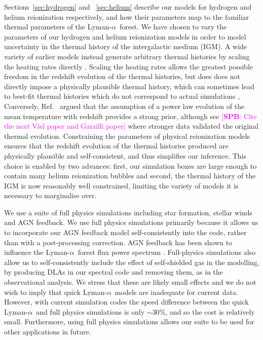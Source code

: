 \documentclass[a4paper,11pt]{article}
\newcommand{\spb}[1]{{\textcolor{magenta}{[{\bf SPB}: #1]}}}
\newcommand{\Lya}{Lyman-$\alpha$}
\begin{document}
Sections~\ref{sec:hydrogen} and ~\ref{sec:helium} describe our models for hydrogen and helium reionization respectively, and how their parameters map to the familiar thermal parameters of the \Lya~forest. We have chosen to vary the parameters of our hydrogen and helium reionization models in order to model uncertainty in the thermal history of the intergalactic medium (IGM).
A wide variety of earlier models instead generate arbitrary thermal histories by scaling the heating rates directly \cite[e.g.~][]{Viel:2006}. Scaling the heating rates allows the greatest possible freedom in the redshift evolution of the thermal histories, but does does not directly impose a physically plausible thermal history, which can sometimes lead to best-fit thermal histories which do not correspond to actual simulations \cite{Walther:2019}, Conversely, Ref.~\cite{Garzilli:2019} argued that the assumption of a power law evolution of the mean temperature with redshift \cite{Viel:2013wdm, Irsic:2017} provides a strong prior, although see \cite{Garzilli:2021} \spb{Cite the next Viel paper and Garzilli paper} where stronger data validated the original thermal evolution. Constraining the parameters of physical reionization models ensures that the redshift evolution of the thermal histories produced are physically plausible and self-consistent, and thus simplifies our inference. This choice is enabled by two advances: first, our simulation boxes are large enough to contain many helium reionization bubbles and second, the thermal history of the IGM is now reasonably well constrained, limiting the variety of models it is necessary to marginalise over.

We use a suite of full physics simulations including star formation, stellar winds and AGN feedback. We use full physics simulations primarily because it allows us to incorporate our AGN feedback model self-consistently into the code, rather than with a post-processing correction. AGN feedback has been shown to influence the \Lya~forest flux power spectrum \cite{Viel:2013, Chabanier:2020}. Full-physics simulations also allow us to self-consistently include the effect of self-shielded gas in the modelling, by producing DLAs in our spectral code and removing them, as in the observational analysis. We stress that these are likely small effects and we do not wish to imply that quick \Lya~models are inadequate for current data. However, with current simulation codes the speed difference between the quick \Lya~and full physics simulations is only $\sim 30\%$, and so the cost is relatively small. Furthermore, using full physics simulations allows our suite to be used for other applications in future.
\end{document}
